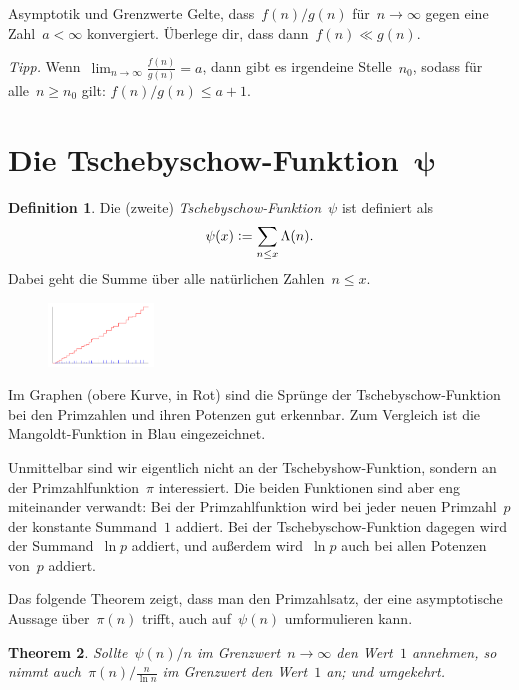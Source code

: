 \documentclass[twoside]{../zirkelblatt1415}
\theoremstyle{definition}
\newtheorem{defn}{Definition}[section]
\theoremstyle{plain}
\newtheorem{thm}[defn]{Theorem}
\theoremstyle{remark}
\newcommand{\defeq}{\vcentcolon=}
\begin{document}
\begin{aufgabe}{Asymptotik und Grenzwerte}\label{aufg:asymp-limes}
Gelte, dass~$f(n) / g(n)$ für~$n \to \infty$ gegen eine Zahl~$a < \infty$
konvergiert. Überlege dir, dass dann~$f(n) \ll g(n)$.

\emph{Tipp.} Wenn~$\lim_{n \to \infty} \frac{f(n)}{g(n)} = a$, dann gibt es
irgendeine Stelle~$n_0$, sodass für alle~$n \geq n_0$ gilt: $f(n)/g(n) \leq
a+1$.
\end{aufgabe}


\section{\texorpdfstring{Die Tschebyschow-Funktion~$\boldsymbol{\psi}$}{Die
Tschebyschow-Funktion~ψ}}

\begin{defn}Die (zweite) \emph{Tschebyschow-Funktion}~$\psi$ ist definiert als
\[ \psi(x) \defeq \sum_{n \leq x} \Lambda(n). \]
Dabei geht die Summe über alle natürlichen Zahlen~$n \leq x$.\end{defn}

\begin{figure}
  \vspace{-2em}
  \includegraphics[width=0.25\textwidth]{chebyshev-function}
\end{figure}
Im Graphen (obere Kurve, in Rot) sind die Sprünge der Tschebyschow-Funktion bei
den Primzahlen und ihren Potenzen gut erkennbar. Zum Vergleich ist die Mangoldt-Funktion in Blau
eingezeichnet.

Unmittelbar sind wir eigentlich nicht an der Tschebyshow-Funktion, sondern an
der Primzahlfunktion~$\pi$ interessiert. Die beiden Funktionen sind aber eng
miteinander verwandt: Bei der Primzahlfunktion wird bei jeder neuen
Primzahl~$p$ der konstante Summand~$1$ addiert. Bei der Tschebyschow-Funktion
dagegen wird der Summand~$\ln p$ addiert, und außerdem wird~$\ln p$ auch bei
allen Potenzen von~$p$ addiert.

Das folgende Theorem zeigt, dass man den Primzahlsatz, der eine asymptotische
Aussage über~$\pi(n)$ trifft, auch auf~$\psi(n)$ umformulieren kann.

\begin{thm}\label{thm:psi-pi}
Sollte~$\psi(n)/n$ im Grenzwert~$n \to \infty$ den Wert~$1$ annehmen, so nimmt
auch~$\pi(n)/\frac{n}{\ln n}$ im Grenzwert den Wert~$1$ an; und umgekehrt.
\end{thm}
\end{document}
